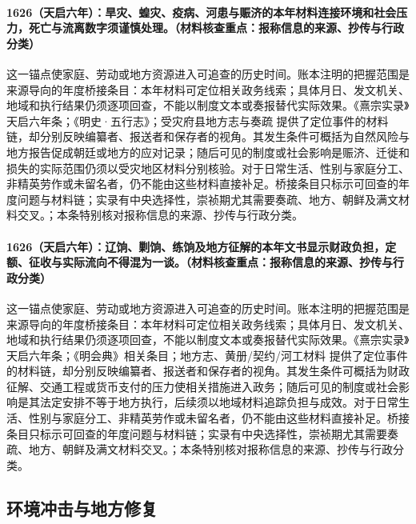 \paragraph{1626（天启六年）：旱灾、蝗灾、疫病、河患与赈济的本年材料连接环境和社会压力，死亡与流离数字须谨慎处理。（材料核查重点：报称信息的来源、抄传与行政分类）} 这一锚点使家庭、劳动或地方资源进入可追查的历史时间。账本注明的把握范围是来源导向的年度桥接条目：本年材料可定位相关政务线索；具体月日、发文机关、地域和执行结果仍须逐项回查，不能以制度文本或奏报替代实际效果。《熹宗实录》天启六年条；《明史·五行志》；受灾府县地方志与奏疏 提供了定位事件的材料链，却分别反映编纂者、报送者和保存者的视角。其发生条件可概括为自然风险与地方报告促成朝廷或地方的应对记录；随后可见的制度或社会影响是赈济、迁徙和损失的实际范围仍须以受灾地区材料分别核验。对于日常生活、性别与家庭分工、非精英劳作或未留名者，仍不能由这些材料直接补足。桥接条目只标示可回查的年度问题与材料链；实录有中央选择性，崇祯期尤其需要奏疏、地方、朝鲜及满文材料交叉。；本条特别核对报称信息的来源、抄传与行政分类。

\paragraph{1626（天启六年）：辽饷、剿饷、练饷及地方征解的本年文书显示财政负担，定额、征收与实际流向不得混为一谈。（材料核查重点：报称信息的来源、抄传与行政分类）} 这一锚点使家庭、劳动或地方资源进入可追查的历史时间。账本注明的把握范围是来源导向的年度桥接条目：本年材料可定位相关政务线索；具体月日、发文机关、地域和执行结果仍须逐项回查，不能以制度文本或奏报替代实际效果。《熹宗实录》天启六年条；《明会典》相关条目；地方志、黄册/契约/河工材料 提供了定位事件的材料链，却分别反映编纂者、报送者和保存者的视角。其发生条件可概括为财政征解、交通工程或货币支付的压力使相关措施进入政务；随后可见的制度或社会影响是其法定安排不等于地方执行，后续须以地域材料追踪负担与成效。对于日常生活、性别与家庭分工、非精英劳作或未留名者，仍不能由这些材料直接补足。桥接条目只标示可回查的年度问题与材料链；实录有中央选择性，崇祯期尤其需要奏疏、地方、朝鲜及满文材料交叉。；本条特别核对报称信息的来源、抄传与行政分类。

\subsection{环境冲击与地方修复}

